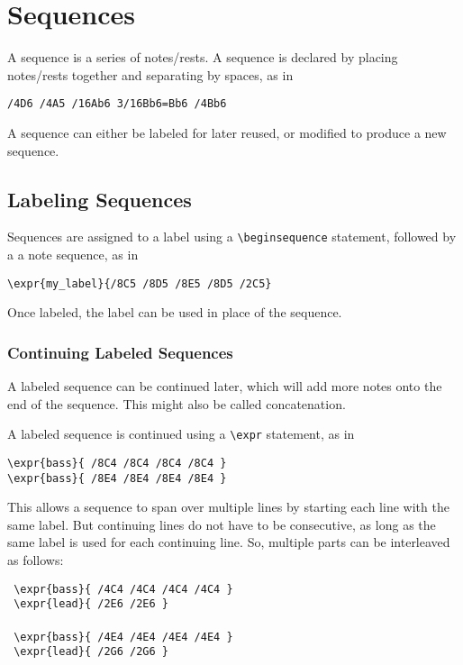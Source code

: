 \documentclass{scrartcl}
\begin{document}
\section{Sequences}
A sequence is a series of notes/rests. A sequence is declared by placing notes/rests together and separating by spaces, as in 
\begin{tabbing}
  \hspace{0.5in}\= \verb|/4D6 /4A5 /16Ab6 3/16Bb6=Bb6 /4Bb6|
\end{tabbing}

A sequence can either be labeled for later reused, or modified to produce a new sequence.

\subsection{Labeling Sequences}
Sequences are assigned to a label using a \verb|\beginsequence| statement, followed by a a note sequence, as in
\begin{tabbing}
  \hspace{0.5in}\= \verb|\expr{my_label}{/8C5 /8D5 /8E5 /8D5 /2C5}|
\end{tabbing}

Once labeled, the label can be used in place of the sequence. 

\subsubsection{Continuing Labeled Sequences}
A labeled sequence can be continued later, which will add more notes onto the end of the sequence. This might also be called concatenation.

A labeled sequence is continued using a \verb|\expr| statement, as in
\begin{tabbing}
  \hspace{0.5in}\= \verb|\expr{bass}{ /8C4 /8C4 /8C4 /8C4 }| \\
  \> \verb|\expr{bass}{ /8E4 /8E4 /8E4 /8E4 }|
\end{tabbing}

This allows a sequence to span over multiple lines by starting each line with the same label. But continuing lines do not have to be consecutive, as long as the same label is used for each continuing line. So, multiple parts can be interleaved as follows:
\begin{tabbing}
  \hspace{1in}\= \verb| \expr{bass}{ /4C4 /4C4 /4C4 /4C4 }| \\
  \> \verb| \expr{lead}{ /2E6 /2E6 }| \\
  \> ~\\
  \> \verb| \expr{bass}{ /4E4 /4E4 /4E4 /4E4 }| \\
  \> \verb| \expr{lead}{ /2G6 /2G6 }| \\
\end{tabbing}
\end{document}
